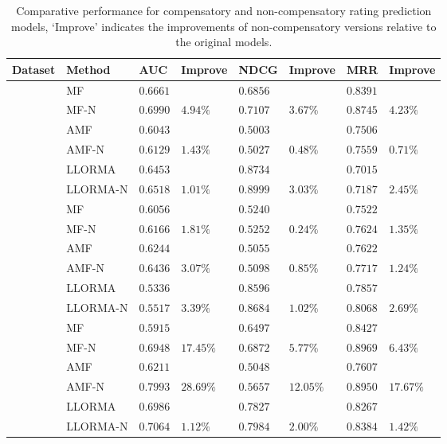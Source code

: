 \documentclass[letterpaper]{article} %
\begin{document}
\begin{table}[htp]
\tiny
\caption{Comparative performance for compensatory and non-compensatory rating prediction models, `Improve' indicates the improvements of non-compensatory versions relative to the original models.}
\begin{center}
\begin{tabular}{p{0.4cm}<{\centering}|p{1.2cm}<{\centering} |p{0.5cm} p{0.6cm} |p{0.5cm} p{0.6cm} |p{0.5cm} p{0.6cm}}
\hline
Dataset	& Method	& AUC	& Improve&	NDCG&	Improve&	MRR	&Improve\\\hline
{} &	MF	& $0.6661$ 	& &	$0.6856$ 	&&	$0.8391$ 	&\\
	&MF-N	&$0.6990$ &	$4.94\%$	&$0.7107 $	&$3.67\%$	&$0.8745$ &	$4.23\%$	\\
	&AMF&	$0.6043$ 	&&	$0.5003$ 	&&	$0.7506$ &\\
	&AMF-N	&$0.6129$ 	&$1.43\%$	&$0.5027$ &	$0.48\%$	&$0.7559$ 	&$0.71\%$	\\
	&LLORMA		&$0.6453$&	&$0.8734$ 	&&	$0.7015$&\\	
	&LLORMA-N	&$0.6518$	&$1.01\%$	&	$0.8999$ 	&$3.03\%$	&$0.7187$ 	&$2.45\%$	\\
	\hline
{}	&MF	&$0.6056 $	&&	$0.5240$&&		$0.7522 $	&	\\
	&MF-N&	$0.6166$ 	&$1.81\%$	&$0.5252$ 	&$0.24\%$	&$0.7624$ 	&$1.35\%$\\
	&AMF	&$0.6244 $	&&	$0.5055 $&&		$0.7622 $	&	\\
	&AMF-N	&$0.6436$ 	&$3.07\%$	&$0.5098$ 	&$0.85\%$	&$0.7717$ 	&$1.24\%$	\\
	&LLORMA	&$0.5336$& &		$0.8596$ 	&&	$0.7857$ 	&	\\
	&LLORMA-N		&$0.5517$	&$3.39\%$ &	$0.8684$ &	$1.02\%$	&$0.8068$ 	&$2.69\%$	\\
	\hline
{}	&MF	&$0.5915$ 	&&	$0.6497$&	&	$0.8427$ &	\\
	&MF-N	&$0.6948$ 	&$17.45\%$	&$0.6872$ 	&$5.77\%$	&$0.8969 $	&$6.43\%$	\\
	&AMF	&$0.6211$ 	&&	$0.5048$ 	&&	$0.7607$ 	&	\\
	&AMF-N	&$0.7993 $&	$28.69\%$	&$0.5657$ 	&$12.05\%$	&$0.8950$ 	&$17.67\%$	\\
	&LLORMA		&$0.6986$&	&$0.7827 $		&&$0.8267$ 		& 	\\
	&LLORMA-N	&$0.7064$	&$1.12\%$&	$0.7984$ 	&$2.00\%$	&$0.8384 $	&$1.42\%$	\\
	\hline
	\end{tabular}
\end{center}
\vspace*{-10pt}
\label{tab:ratingresult}
\end{table}%
\end{document}
